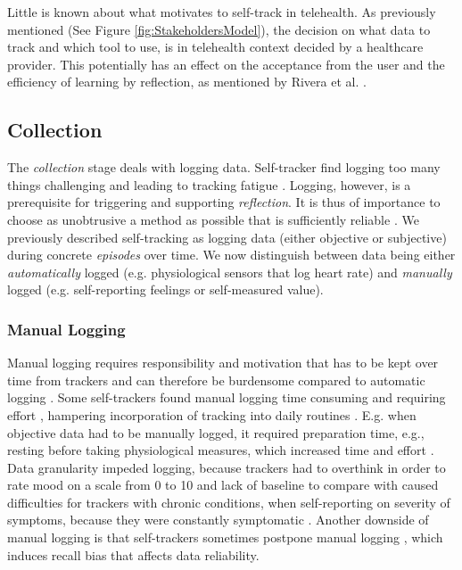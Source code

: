Little is known about what motivates to self-track in telehealth. As previously mentioned (See Figure \ref{fig:StakeholdersModel}), the decision on what data to track and which tool to use, is in telehealth context decided by a healthcare provider. This potentially has an effect on the acceptance from the user and the efficiency of learning by reflection, as mentioned by Rivera et al. \cite{Rivera}.

\subsection{Collection} 
The \textit{collection} stage deals with logging data. Self-tracker find logging too many things challenging and leading to tracking fatigue \cite{Choe2014, Patel2012}. Logging, however, is a prerequisite for triggering and supporting \textit{reflection}. It is thus of importance to choose as unobtrusive a method as possible that is sufficiently reliable \cite{Muller}. We previously described self-tracking as logging data (either objective or subjective) during concrete \textit{episodes} over time. We now distinguish between data being either \textit{automatically} logged (e.g. physiological sensors that log heart rate) and \textit{manually} logged (e.g. self-reporting feelings or self-measured value). 

\subsubsection{Manual Logging}
Manual logging requires responsibility and motivation that has to be kept over time from trackers and can therefore be burdensome compared to automatic logging \cite{Li2010, Muller}. Some self-trackers found manual logging time consuming and requiring effort \cite{Ancker2015}, hampering incorporation of tracking into daily routines \cite{Verdezoto2015, Ancker2015}. E.g. when objective data had to be manually logged, it required preparation time, e.g., resting before taking physiological measures, which increased time and effort \cite{Verdezoto2015}. Data granularity impeded logging, because  trackers had to overthink in order to rate mood on a scale from 0 to 10 \cite{Oh2015} and lack of baseline to compare with caused difficulties for trackers with chronic conditions, when self-reporting on severity of symptoms, because they were constantly symptomatic \cite{piloting}. Another downside of manual logging is that self-trackers sometimes postpone manual logging \cite{MacLeod2014}, which induces recall bias that affects data reliability. 

